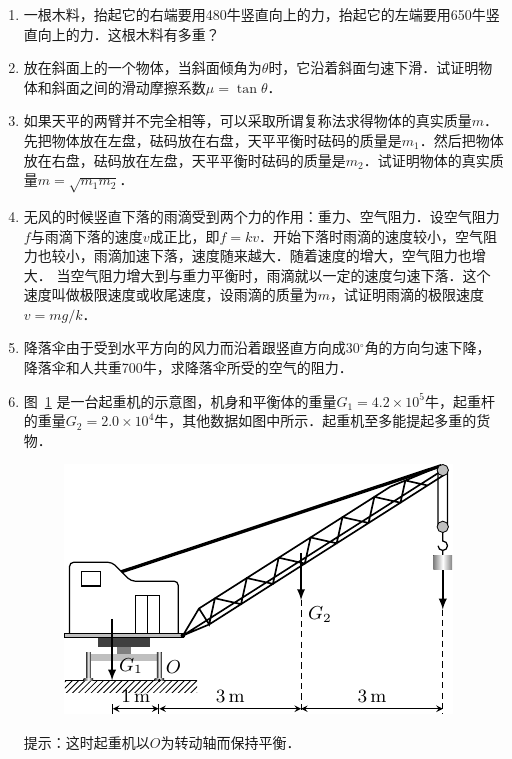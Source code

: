 \begin{enumerate}
\item 一根木料，抬起它的右端要用480牛竖直向上的力，抬起它的左端要用650牛竖直向上的力．这根木料有多重？
\item 放在斜面上的一个物体，当斜面倾角为$\theta$时，它沿着斜面匀速下滑．试证明物体和斜面之间的滑动摩擦系数$\mu=\tan \theta$．
\item 如果天平的两臂并不完全相等，可以采取所谓复称法求得物体的真实质量$m$．先把物体放在左盘，砝码放在右盘，天平平衡时砝码的质量是$m_1$．然后把物体放在右盘，砝码放在左盘，天平平衡时砝码的质量是$m_2$．试证明物体的真实质量$m=\sqrt{m_1m_2}$．
\item 无风的时候竖直下落的雨滴受到两个力的作用：重力、空气阻力．设空气阻力$f$与雨滴下落的速度$v$成正比，即$f=kv$．开始下落时雨滴的速度较小，空气阻力也较小，雨滴加速下落，速度随来越大．随着速度的增大，空气阻力也增大．
当空气阻力增大到与重力平衡时，雨滴就以一定的速度匀速下落．这个速度叫做极限速度或收尾速度，设雨滴的质量为$m$，试证明雨滴的极限速度$v=mg/k$．
\item 降落伞由于受到水平方向的风力而沿着跟竖直方向成30$^\circ$角的方向匀速下降，降落伞和人共重700牛，求降落伞所受的空气的阻力．
\item 图~\ref{fig_A_6-25} 是一台起重机的示意图，机身和平衡体的重量$G_1=4.2\times 10^5$牛，起重杆的重量$G_2=2.0\times 10^4$牛，其他数据如图中所示．起重机至多能提起多重的货物．
\begin{figure}[htbp]
    \centering
    \includegraphics{fig/A/6-25.pdf}
    \caption{}\label{fig_A_6-25}
\end{figure}
提示：这时起重机以$O$为转动轴而保持平衡．


\end{enumerate}
